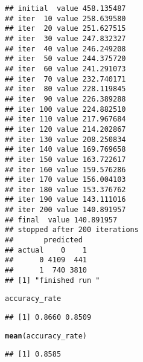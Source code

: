\documentclass[titlepage]{article}\usepackage[]{graphicx}\usepackage[]{color}
\makeatletter
\newcommand{\hlstd}[1]{\textcolor[rgb]{0.345,0.345,0.345}{#1}}%
\newcommand{\hlkwd}[1]{\textcolor[rgb]{0.737,0.353,0.396}{\textbf{#1}}}%
\newenvironment{kframe}{%
 \def\at@end@of@kframe{}%
 \ifinner\ifhmode%
  \def\at@end@of@kframe{\end{minipage}}%
  \begin{minipage}{\columnwidth}%
 \fi\fi%
 \def\FrameCommand##1{\hskip\@totalleftmargin \hskip-\fboxsep
 \colorbox{shadecolor}{##1}\hskip-\fboxsep
     \hskip-\linewidth \hskip-\@totalleftmargin \hskip\columnwidth}%
 \MakeFramed {\advance\hsize-\width
   \@totalleftmargin\z@ \linewidth\hsize
   \@setminipage}}%
 {\par\unskip\endMakeFramed%
 \at@end@of@kframe}
\newenvironment{knitrout}{}{} %
\makeatother
\begin{document}
\begin{knitrout}
\begin{kframe}
\begin{verbatim}
## initial  value 458.135487 
## iter  10 value 258.639580
## iter  20 value 251.627515
## iter  30 value 247.832327
## iter  40 value 246.249208
## iter  50 value 244.375720
## iter  60 value 241.291073
## iter  70 value 232.740171
## iter  80 value 228.119845
## iter  90 value 226.389288
## iter 100 value 224.882510
## iter 110 value 217.967684
## iter 120 value 214.202867
## iter 130 value 208.250834
## iter 140 value 169.769658
## iter 150 value 163.722617
## iter 160 value 159.576286
## iter 170 value 156.004103
## iter 180 value 153.376762
## iter 190 value 143.111016
## iter 200 value 140.891957
## final  value 140.891957 
## stopped after 200 iterations
##       predicted
## actual    0    1
##      0 4109  441
##      1  740 3810
## [1] "finished run "
\end{verbatim}
\begin{alltt}
\hlstd{accuracy_rate}
\end{alltt}
\begin{verbatim}
## [1] 0.8660 0.8509
\end{verbatim}
\begin{alltt}
\hlkwd{mean}\hlstd{(accuracy_rate)}
\end{alltt}
\begin{verbatim}
## [1] 0.8585
\end{verbatim}
\end{kframe}
\end{knitrout}
\end{document}
